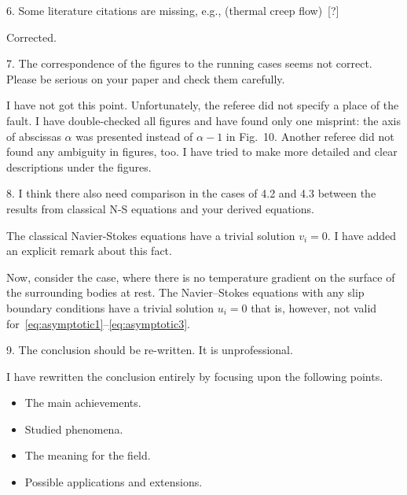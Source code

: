 \documentclass{article}
\begin{document}
\begin{quoting}
6. Some literature citations are missing, e.g., (thermal creep flow)~[?]
\end{quoting}

Corrected.

\begin{quoting}
7. The correspondence of the figures to the running cases seems not
correct. Please be serious on your paper and check them carefully.
\end{quoting}

I have not got this point.
Unfortunately, the referee did not specify a place of the fault.
I have double-checked all figures and have found only one misprint:
the axis of abscissas \(\alpha\) was presented instead of \(\alpha-1\) in Fig.~10.
Another referee did not found any ambiguity in figures, too.
I have tried to make more detailed and clear descriptions under the figures.

\begin{quoting}
8. I think there also need comparison in the cases of 4.2 and 4.3
between the results from classical N-S equations and your derived
equations.
\end{quoting}

The classical Navier-Stokes equations have a trivial solution \(v_i = 0\).
I have added an explicit remark about this fact.

\begin{leftbar}
Now, consider the case, where there is no temperature gradient on the surface of the surrounding bodies at rest.
The Navier--Stokes equations with any slip boundary conditions have a trivial solution \(u_i = 0\)
that is, however, not valid for~\eqref{eq:asymptotic1}--\eqref{eq:asymptotic3}.
\end{leftbar}

\begin{quoting}
9. The conclusion should be re-written. It is unprofessional.
\end{quoting}

I have rewritten the conclusion entirely by focusing upon the following points.
\begin{itemize}
\item The main achievements.
\item Studied phenomena.
\item The meaning for the field.
\item Possible applications and extensions.
\end{itemize}
\end{document}
